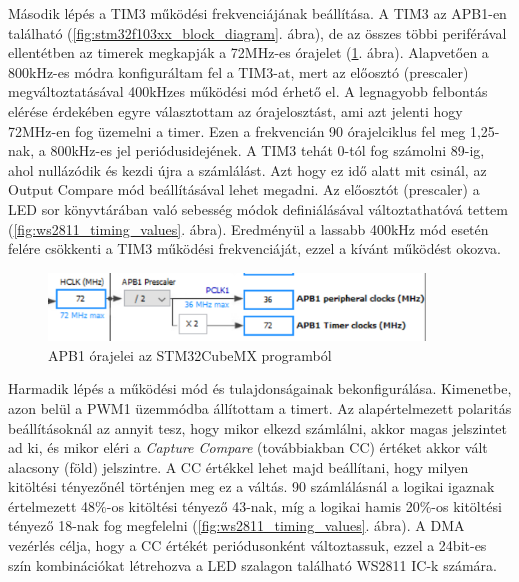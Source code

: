 \documentclass[../main.tex]{subfiles}
\begin{document}
            
            Második lépés a TIM3 működési frekvenciájának beállítása. A TIM3 az APB1-en található (\ref{fig:stm32f103xx_block_diagram}. ábra), de az összes többi periférával ellentétben az timerek megkapják a 72MHz-es órajelet (\ref{fig:tim3_clk_src}. ábra). Alapvetően a 800kHz-es módra konfiguráltam fel a TIM3-at, mert az előosztó (prescaler) megváltoztatásával 400kHzes működési mód érhető el.
            A legnagyobb felbontás elérése érdekében egyre választottam az órajelosztást, ami azt jelenti hogy 72MHz-en fog üzemelni a timer. Ezen a frekvencián 90 órajelciklus fel meg 1,25\micros-nak, a 800kHz-es jel periódusidejének. A TIM3 tehát 0-tól fog számolni 89-ig, ahol nullázódik és kezdi újra a számlálást. Azt hogy ez idő alatt mit csinál, az Output Compare mód beállításával lehet megadni.
            Az előosztót (prescaler) a LED sor könyvtárában való sebesség módok definiálásával változtathatóvá tettem (\ref{fig:ws2811_timing_values}. ábra). Eredményül a lassabb 400kHz mód esetén felére csökkenti a TIM3 működési frekvenciáját, ezzel a kívánt működést okozva.
            
            \begin{figure}[h!]
                \centering
                    \includegraphics[width=10cm]{mbed_res/tim3_clock_src}
                \caption{APB1 órajelei az STM32CubeMX programból}
                \label{fig:tim3_clk_src}
            \end{figure}
            
            Harmadik lépés a működési mód és tulajdonságainak bekonfigurálása. Kimenetbe, azon belül a PWM1 üzemmódba állítottam a timert. Az alapértelmezett polaritás beállításoknál az annyit tesz, hogy mikor elkezd számlálni, akkor magas jelszintet ad ki, és mikor eléri a \textit{Capture Compare} (továbbiakban CC) értéket akkor vált alacsony (föld) jelszintre. A CC értékkel lehet majd beállítani, hogy milyen kitöltési tényezőnél történjen meg ez a váltás. 90 számlálásnál a logikai igaznak értelmezett 48\%-os kitöltési tényező 43-nak, míg a logikai hamis 20\%-os kitöltési tényező 18-nak fog megfelelni (\ref{fig:ws2811_timing_values}. ábra). A DMA vezérlés célja, hogy a CC értékét periódusonként változtassuk, ezzel a 24bit-es szín kombinációkat létrehozva a LED szalagon található WS2811 IC-k számára.
            
\end{document}
